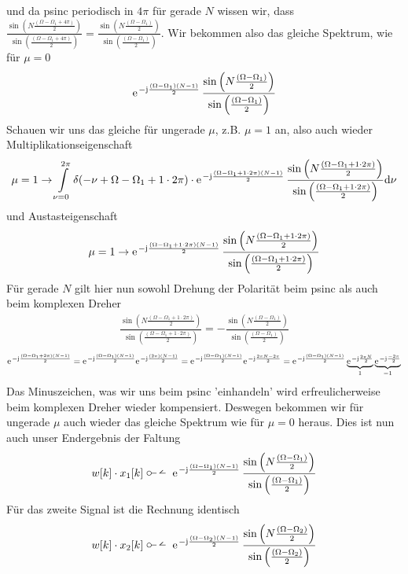 \begin{ExCalc}
und da psinc periodisch in $4\pi$ für gerade $N$ wissen wir, dass
$\frac{\sin\left(N\frac{(\Omega-\Omega_1 + 4\pi)}{2}\right)}{\sin\left(\frac{(\Omega-\Omega_1 + 4\pi)}{2}\right)} = \frac{\sin\left(N\frac{(\Omega-\Omega_1)}{2}\right)}{\sin\left(\frac{(\Omega-\Omega_1)}{2}\right)}$.
Wir bekommen also das gleiche Spektrum, wie für $\mu=0$
\begin{align}
\e^{-\im\frac{(\Omega-\Omega_1)(N-1)}{2}}\,
\frac{\sin\left(N\frac{(\Omega-\Omega_1)}{2}\right)}{\sin\left(\frac{(\Omega-\Omega_1)}{2}\right)}
\end{align}
%
Schauen wir uns das gleiche für ungerade $\mu$, z.B. $\mu=1$ an, also auch wieder
Multiplikationseigenschaft
\begin{align}
\mu=1\rightarrow
\int\limits_{\nu=0}^{2\pi}
\delta(-\nu+\Omega-\Omega_1+1\cdot2\pi)
\cdot
\e^{-\im\frac{(\Omega-\Omega_1 + 1\cdot2\pi)(N-1)}{2}}\,
\frac{\sin\left(N\frac{(\Omega-\Omega_1 + 1\cdot2\pi)}{2}\right)}{\sin\left(\frac{(\Omega-\Omega_1 + 1\cdot2\pi)}{2}\right)}\fsd \nu
\end{align}
und Austasteigenschaft
\begin{align}
\mu=1\rightarrow
\e^{-\im\frac{(\Omega-\Omega_1 + 1\cdot2\pi)(N-1)}{2}}\,
\frac{\sin\left(N\frac{(\Omega-\Omega_1 + 1\cdot2\pi)}{2}\right)}{\sin\left(\frac{(\Omega-\Omega_1 + 1\cdot2\pi)}{2}\right)}
\end{align}
Für gerade $N$ gilt hier nun sowohl Drehung der Polarität beim psinc als auch beim komplexen Dreher
\begin{align}
\frac{\sin\left(N\frac{(\Omega-\Omega_1 + 1\cdot2\pi)}{2}\right)}{\sin\left(\frac{(\Omega-\Omega_1 + 1\cdot2\pi)}{2}\right)}
= -
\frac{\sin\left(N\frac{(\Omega-\Omega_1)}{2}\right)}{\sin\left(\frac{(\Omega-\Omega_1)}{2}\right)}
\end{align}
%
\begin{align}
\e^{-\im\frac{(\Omega-\Omega_1 + 2\pi)(N-1)}{2}}=
\e^{-\im\frac{(\Omega-\Omega_1)(N-1)}{2}}
\e^{-\im\frac{(2\pi)(N-1)}{2}}=
\e^{-\im\frac{(\Omega-\Omega_1)(N-1)}{2}}
\e^{-\im\frac{2\pi N -2\pi}{2}}=
\e^{-\im\frac{(\Omega-\Omega_1)(N-1)}{2}}
\underbrace{\e^{-\im\frac{2\pi N}{2}}}_{1}
\underbrace{\e^{-\im\frac{-2\pi}{2}}}_{-1}
\end{align}
Das Minuszeichen, was wir uns beim psinc 'einhandeln' wird erfreulicherweise
beim komplexen Dreher wieder kompensiert.  Deswegen bekommen wir für ungerade $\mu$
auch wieder das gleiche Spektrum wie für $\mu=0$ heraus.
%
Dies ist nun auch unser Endergebnis der Faltung
\begin{align}
w[k] \cdot x_1[k]\dtft
\e^{-\im\frac{(\Omega-\Omega_1)(N-1)}{2}}\,
\frac{\sin\left(N\frac{(\Omega-\Omega_1)}{2}\right)}{\sin\left(\frac{(\Omega-\Omega_1)}{2}\right)}
\end{align}
Für das zweite Signal ist die Rechnung identisch
\begin{align}
w[k] \cdot x_2[k]\dtft
\e^{-\im\frac{(\Omega-\Omega_2)(N-1)}{2}}\,
\frac{\sin\left(N\frac{(\Omega-\Omega_2)}{2}\right)}{\sin\left(\frac{(\Omega-\Omega_2)}{2}\right)}
\end{align}
%
\end{ExCalc}
